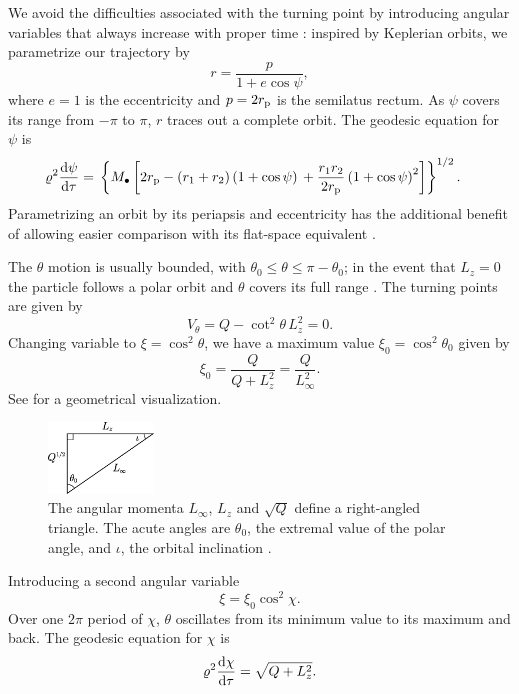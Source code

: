 We avoid the difficulties associated with the turning point by introducing angular variables that always increase with proper time \citep{Drasco2004}: inspired by Keplerian orbits, we parametrize our trajectory by
\begin{equation}
r = \frac{p}{1+e\cos\psi},
\end{equation}
where $e = 1$ is the eccentricity and $p = 2r_\mathrm{p}$ is the semilatus rectum. As $\psi$ covers its range from $-\pi$ to $\pi$, $r$ traces out a complete orbit. The geodesic equation for $\psi$ is
\begin{align}
\varrho^2 \diff{\psi}{\tau} = {} & \left\{M_\bullet\left[2r\sub{p} - \left(r_1 + r_2\right)\left(1 + \cos\psi\right) \vphantom{\frac{r_1 r_2}{2r\sub{p}}} +  \frac{r_1 r_2}{2r\sub{p}}\left(1 + \cos\psi\right)^2\right]\right\}^{1/2}.
\end{align}
Parametrizing an orbit by its periapsis and eccentricity has the additional benefit of allowing easier comparison with its flat-space equivalent \citep{Gair2005}.

The $\theta$ motion is usually bounded, with $\theta_0 \leq \theta \leq \pi - \theta_0$; in the event that $L_z = 0$ the particle follows a polar orbit and $\theta$ covers its full range \citep{Wilkins1972}. The turning points are given by
\begin{equation}
V_\theta = Q - \cot^2\theta\, L_z^2 = 0.
\end{equation}
Changing variable to $\xi = \cos^2\theta$, we have a maximum value $\xi_0 = \cos^2\theta_0$ given by
\begin{equation}
\xi_0 = \frac{Q}{Q+L_z^2} = \frac{Q}{L_\infty^2}.
\label{eq:theta_0}
\end{equation}
See  for a geometrical visualization.
\begin{figure}
\begin{center}
\includegraphics[width=0.25\textwidth]{./images/Triangle}
    \caption{The angular momenta $L_\infty$, $L_z$ and $\sqrt{Q}$ define a right-angled triangle. The acute angles are $\theta_0$, the extremal value of the polar angle, and $\iota$, the orbital inclination \citep{Glampedakis2002}.\label{fig:L_triangle}}
\end{center}
\end{figure}
Introducing a second angular variable \citep{Drasco2004}
\begin{equation}
\xi = \xi_0\cos^2\chi.
\end{equation}
Over one $2\pi$ period of $\chi$, $\theta$ oscillates from its minimum value to its maximum and back. The geodesic equation for $\chi$ is
\begin{equation}
\varrho^2\frac{\mathrm{d} {\chi}}{\mathrm{d} {\tau}} = \sqrt{Q + L_z^2}.
\end{equation}

